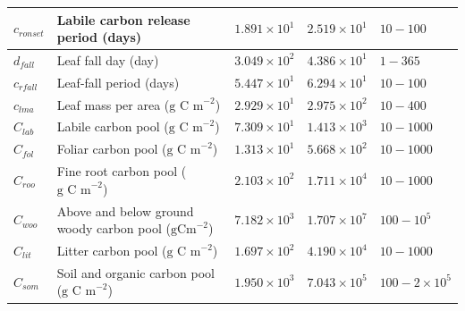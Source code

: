\documentclass[draft,linenumbers]{agujournal}
\begin{document}
\begin{table}[ht]
\begin{center}
\begin{tabular}{| l | p{4.5cm} | p{1.7cm} | p{1.7cm} | p{1.7cm} |}
$c_{ronset}$ & Labile carbon release period (days) & $1.891\times 10^{1}$ & $2.519\times 10^{1}$ & $10 - 100$ \\ \hline
$d_{fall}$ & Leaf fall day (day) & $3.049\times 10^{2}$ & $4.386\times 10^{1}$ & $1 - 365$ \\ \hline
$c_{rfall}$ & Leaf-fall period (days) & $5.447\times 10^{1}$ & $6.294\times 10^{1}$ & $10 - 100$ \\ \hline
$c_{lma}$ & Leaf mass per area ($\text{g C m}^{-2}$) & $2.929\times 10^{1}$ & $2.975\times 10^{2}$ & $10 - 400$ \\ \hline
$C_{lab}$ & Labile carbon pool ($\text{g C m}^{-2}$) & $7.309\times 10^{1}$ & $1.413\times 10^{3}$ & $10 - 1000$ \\ \hline
$C_{fol}$ & Foliar carbon pool ($\text{g C m}^{-2}$) & $1.313\times 10^{1}$ & $5.668\times 10^{2}$ & $10 - 1000$ \\ \hline
$C_{roo}$ & Fine root carbon pool ($\text{g C m}^{-2}$) & $2.103\times 10^{2}$ & $1.711\times 10^{4}$ & $10 - 1000$ \\ \hline
$C_{woo}$ & Above and below ground woody carbon pool ($\text{gCm}^{-2}$) & $7.182\times 10^{3}$ & $1.707\times 10^{7}$ & $100 - 10^{5}$ \\ \hline
$C_{lit}$ & Litter carbon pool ($\text{g C m}^{-2}$) & $1.697\times 10^{2}$ & $4.190\times 10^{4}$ & $10 - 1000$ \\ \hline
$C_{som}$ & Soil and organic carbon pool ($\text{g C m}^{-2}$) & $1.950\times 10^{3}$ & $7.043\times 10^{5}$ & $100 - 2 \times 10^{5}$  \\ \hline
	\end{tabular}
	\label{table:xbvars}
\end{center} 
\end{table}


%
%

%
\end{document}
